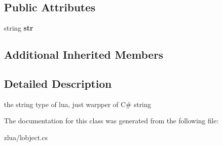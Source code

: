 \subsection*{Public Attributes}
\begin{DoxyCompactItemize}
\item 
\mbox{\label{classzlua_1_1_t_string_a35ab6c458880b6b8da5db37675809357}} 
string {\bfseries str}
\end{DoxyCompactItemize}
\subsection*{Additional Inherited Members}


\subsection{Detailed Description}
the string type of lua, just warpper of C\# string 



The documentation for this class was generated from the following file\+:\begin{DoxyCompactItemize}
\item 
zlua/lobject.\+cs\end{DoxyCompactItemize}

